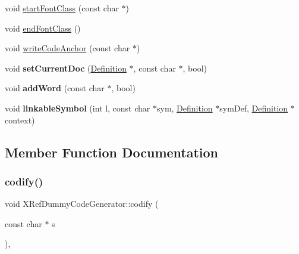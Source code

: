 \begin{DoxyCompactItemize}
void \mbox{\hyperlink{class_x_ref_dummy_code_generator_a5c53cb36c03f583b7b236e482a0a6693}{start\+Font\+Class}} (const char $\ast$)
\item 
void \mbox{\hyperlink{class_x_ref_dummy_code_generator_a9a502e533ffc65e8db2b84e07a0d468a}{end\+Font\+Class}} ()
\item 
void \mbox{\hyperlink{class_x_ref_dummy_code_generator_aae68bc8b3e507f39d5613d2840c5f10b}{write\+Code\+Anchor}} (const char $\ast$)
\item 
\mbox{\label{class_x_ref_dummy_code_generator_a7265159a7ae0ab4da18f2f9455bfc891}} 
void {\bfseries set\+Current\+Doc} (\mbox{\hyperlink{class_definition}{Definition}} $\ast$, const char $\ast$, bool)
\item 
\mbox{\label{class_x_ref_dummy_code_generator_a3dfe2201a5c05c81151f82c37223ed6b}} 
void {\bfseries add\+Word} (const char $\ast$, bool)
\item 
\mbox{\label{class_x_ref_dummy_code_generator_a8bcd040a112a359af5b25cc0ae4971b9}} 
void {\bfseries linkable\+Symbol} (int l, const char $\ast$sym, \mbox{\hyperlink{class_definition}{Definition}} $\ast$sym\+Def, \mbox{\hyperlink{class_definition}{Definition}} $\ast$context)
\end{DoxyCompactItemize}


\subsection{Member Function Documentation}
\mbox{\label{class_x_ref_dummy_code_generator_a81331d5775ec9ff49ef03ebc8c0a0dae}} 
\subsubsection{\texorpdfstring{codify()}{codify()}}
{\footnotesize\ttfamily void X\+Ref\+Dummy\+Code\+Generator\+::codify (\begin{DoxyParamCaption}\item[{const char $\ast$}]{s }\end{DoxyParamCaption})\hspace{0.3cm}{\ttfamily [inline]}, {\ttfamily [virtual]}}

